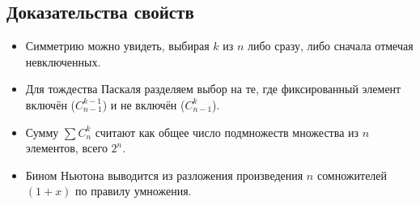 \subsection{Доказательства свойств}
\begin{itemize}
	\item Симметрию можно увидеть, выбирая $k$ из $n$ либо сразу, либо сначала отмечая невключенных.
	\item Для тождества Паскаля разделяем выбор на те, где фиксированный элемент включён ($C_{n-1}^{k-1}$) и не включён ($C_{n-1}^k$).
	\item Сумму $\sum C_n^k$ считают как общее число подмножеств множества из $n$ элементов, всего $2^n$.
	\item Бином Ньютона выводится из разложения произведения $n$ сомножителей $(1+x)$ по правилу умножения.
\end{itemize}
